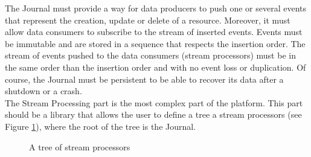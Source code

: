 The Journal must provide a way for data producers to push one or several events that represent the creation, update or 
delete of a resource. Moreover, it must allow data consumers to subscribe to the stream of inserted events. Events must be
immutable and are stored in a sequence that respects the insertion order. The stream of events pushed to the data consumers
(stream processors) must be in the same order than the insertion order and with no event loss or duplication. Of course, the Journal must be persistent to
be able to recover its data after a shutdown or a crash.
\\

The Stream Processing part is the most complex part of the platform. This part should be a library that allows the user
to define a tree a stream processors (see Figure \ref{fig:tree}), where the root of the tree is the Journal. 

\begin{figure}[h]
  \begin{center} 
    \caption{A tree of stream processors}
    \label{fig:tree}
  \end{center}
\end{figure}

